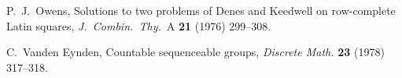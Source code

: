 \documentclass[12pt,a4paper]{article}
\newcommand{\Z}{\mathbb{Z}}
\begin{document}
\begin{thebibliography}{99}
P.~J.~Owens,  Solutions to two problems of Denes and Keedwell on row-complete
Latin squares, {\em J.~Combin.~Thy.}~A {\bf 21} (1976) 299--308.




C.~Vanden Eynden, Countable sequenceable groups, {\em Discrete Math.} {\bf 23} (1978) 317--318.








\end{thebibliography}
\end{document}
